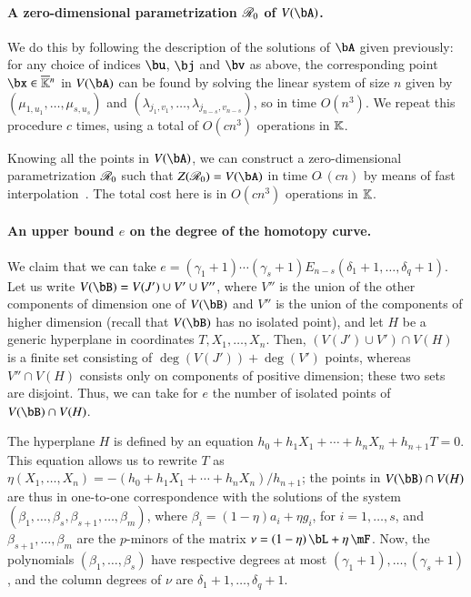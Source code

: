 \documentclass[amsthm]{elsart}
\begin{document}
\paragraph*{A zero-dimensional parametrization $\mathscr{R}_0$ of $V(\bA)$.} 
We do this by following the description of the solutions of $\bA$
given previously: for any choice of indices $\bu$, $\bj$ and $\bv$ as
above, the corresponding point $\bx \in \KKbar{}^n$ in $V(\bA)$ can be
found by solving the linear system of size $n$ given by
$(\mu_{1,u_1},\dots,\mu_{s,u_s})$ and
$(\lambda_{j_1,v_1},\dots,\lambda_{j_{n-s},v_{n-s}})$, so in time
$O(n^3)$. We repeat this procedure $c$ times, using a total of $O(c
n^3)$ operations in $\mathbb{K}$.

Knowing all the points in $V(\bA)$, we can construct a
zero-dimensional parametrization $\mathscr{R}_0$ such that
$Z(\scrR_0)=V(\bA)$ in time $O\tilde{~}(c n)$ by means of fast
interpolation~\cite[Chapter~10]{GaGe03}.  The total cost here is in
$O(c n^3)$ operations in $\mathbb{K}$.

\paragraph*{An upper bound $e$ on the degree of the homotopy curve.}  We claim that we
can take $e=(\gamma_1+1)\cdots(\gamma_s+1) E_{n-s}(\delta_1+1, \ldots,
\delta_q+1)$.  Let us write $V(\bB)=V(J') \cup V' \cup V''$, where
$V''$ is the union of the other components of dimension one of
$V(\bB)$ and $V''$ is the union of the components of higher dimension
(recall that $V(\bB)$ has no isolated point), and let $H$ be a
generic hyperplane in coordinates $T,X_1,\dots,X_n$. Then, $(V(J')
\cup V') \cap V(H)$ is a finite set consisting of $\deg(V(J')) +
\deg(V')$ points, whereas $V'' \cap V(H)$ consists only on components
of positive dimension; these two sets are disjoint. Thus, we can take
for $e$ the number of isolated points of $V(\bB)\cap V(H)$.

The hyperplane $H$ is defined by an equation
$h_0 + h_1 X_1 + \cdots + h_{n}X_{n} + h_{n+1} T=0$. This equation
allows us to rewrite $T$ as
$\eta(X_1,\dots,X_n)=-(h_0 + h_1 X_1 + \cdots +
h_{n}X_{n})/h_{n+1}$;
the points in $V(\bB)\cap V(H)$ are thus in one-to-one correspondence
with the solutions of the system
$(\beta_1,\dots,\beta_s,\beta_{s+1},\dots,\beta_m)$, where
$\beta_i=(1-\eta) a_i + \eta g_i$, for $i=1,\dots,s$, and
$\beta_{s+1},\dots,\beta_m$ are the $p$-minors of the matrix
${\nu}=(1-\eta)\, \bL + \eta \, \mF $.  Now, the polynomials
$(\beta_1,\dots,\beta_s)$ have respective degrees at most
$(\gamma_1+1),\dots,(\gamma_s+1)$, and the column degrees of ${\nu}$
are $\delta_1+1,\dots,\delta_q+1$.
\end{document}
